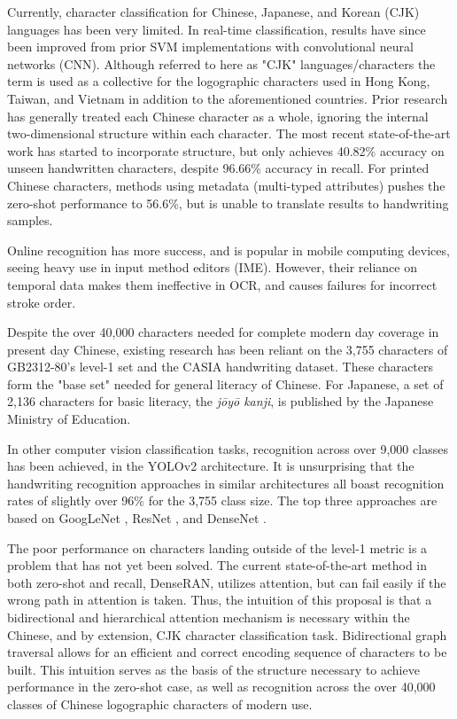 Currently, character classification for Chinese, Japanese, and Korean (CJK) languages has been very limited. In real-time classification, results have since been improved from prior SVM implementations with convolutional neural networks (CNN). Although referred to here as "CJK" languages/characters the term is used as a collective for the logographic characters used in Hong Kong, Taiwan, and Vietnam in addition to the aforementioned countries. Prior research has generally treated each Chinese character as a whole, ignoring the internal two-dimensional structure within each character. The most recent state-of-the-art work has started to incorporate structure, but only achieves 40.82\% accuracy on unseen handwritten characters, despite 96.66\% accuracy in recall\cite{denseran}. For printed Chinese characters, methods using metadata (multi-typed attributes) pushes the zero-shot performance to 56.6\%\cite{multi-attribute-recognition}, but is unable to translate results to handwriting samples.

Online recognition has more success, and is popular in mobile computing devices\cite{online-handwriting}, seeing heavy use in input method editors (IME). However, their reliance on temporal data makes them ineffective in OCR, and causes failures for incorrect stroke order.

Despite the over 40,000 characters needed for complete modern day coverage in present day Chinese, existing research has been reliant on the 3,755 characters of GB2312-80's level-1 set and the CASIA handwriting dataset\cite{casia-handwriting-db}. These characters form the "base set" needed for general literacy of Chinese. For Japanese, a set of 2,136 characters for basic literacy, the \textit{jōyō kanji}, is published by the Japanese Ministry of Education.

In other computer vision classification tasks, recognition across over 9,000 classes has been achieved, in the YOLOv2 architecture\cite{yolo}. It is unsurprising that the handwriting recognition approaches in similar architectures all boast recognition rates of slightly over 96\% for the 3,755 class size. The top three approaches are based on GoogLeNet \cite{hccr-googlenet}, ResNet \cite{multi-attribute-recognition}, and DenseNet \cite{denseran}.

The poor performance on characters landing outside of the level-1 metric is a problem that has not yet been solved. The current state-of-the-art method in both zero-shot and recall, DenseRAN\cite{denseran}, utilizes attention, but can fail easily if the wrong path in attention is taken. Thus, the intuition of this proposal is that a bidirectional and hierarchical attention mechanism is necessary within the Chinese, and by extension, CJK character classification task.
Bidirectional graph traversal allows for an efficient and correct encoding sequence of characters to be built. This intuition serves as the basis of the structure necessary to achieve performance in the zero-shot case, as well as recognition across the over 40,000 classes of Chinese logographic characters of modern use.
